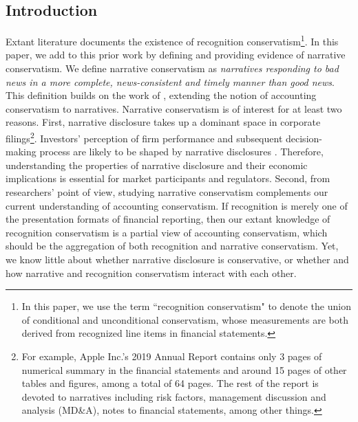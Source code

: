 \documentclass[a4paper]{article}
\begin{document}
\begin{spacing}{2}
\clearpage

\setcounter{page}{1}
\section{Introduction}
Extant literature documents the existence of recognition conservatism\footnote{In this paper, we use the term ``recognition conservatism" to denote the union of conditional and unconditional conservatism, whose measurements are both derived from recognized line items in financial statements.}. In this paper, we add to this prior work by defining and providing evidence of narrative conservatism. We define narrative conservatism as \textit{narratives responding to bad news in a more complete, news-consistent and timely manner than good news}. This definition builds on the work of \citet*{basuConservatismPrincipleAsymmetric1997}, extending the notion of accounting conservatism to narratives. Narrative conservatism is of interest for at least two reasons. First, narrative disclosure takes up a dominant space in corporate filings\footnote{For example, Apple Inc.'s 2019 Annual Report contains only 3 pages of numerical summary in the financial statements and around 15 pages of other tables and figures, among a total of 64 pages. The rest of the report is devoted to narratives including risk factors, management discussion and analysis (MD\&A), notes to financial statements, among other things.}. Investors' perception of firm performance and subsequent decision-making process are likely to be shaped by narrative disclosures \citep*{liTextualAnalysisCorporate2010}. Therefore, understanding the properties of narrative disclosure and their economic implications is essential for market participants and regulators. Second, from researchers' point of view, studying narrative conservatism complements our current understanding of accounting conservatism. If recognition is merely one of the presentation formats of financial reporting, then our extant knowledge of recognition conservatism is a partial view of accounting conservatism, which should be the aggregation of both recognition and narrative conservatism. Yet, we know little about whether narrative disclosure is conservative, or whether and how narrative and recognition conservatism interact with each other.


\end{spacing}
\end{document}
